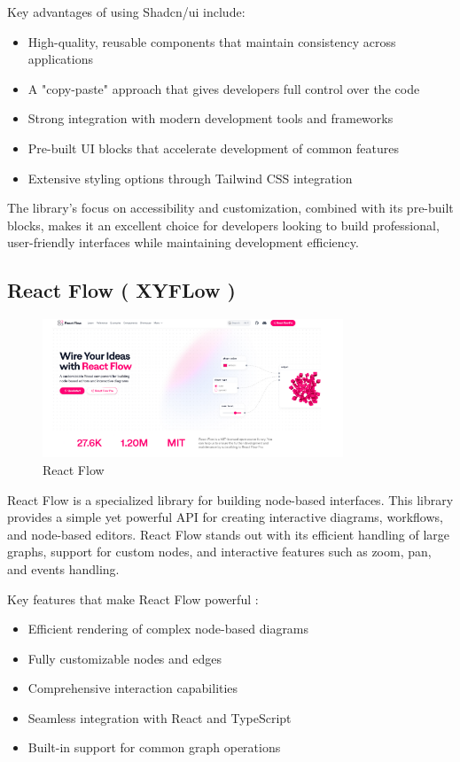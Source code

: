 Key advantages of using Shadcn/ui include:

\begin{itemize}
\item High-quality, reusable components that maintain consistency across applications
\item A "copy-paste" approach that gives developers full control over the code
\item Strong integration with modern development tools and frameworks
\item Pre-built UI blocks that accelerate development of common features
\item Extensive styling options through Tailwind CSS integration
\end{itemize}

The library's focus on accessibility and customization, combined with its pre-built blocks, makes it an excellent choice for developers looking to build professional, user-friendly interfaces while maintaining development efficiency.
\subsection{React Flow ( XYFLow )}
\begin{figure}[H]
    \centering
    \includegraphics[width=0.8\textwidth]{figures/reactxy.png}
    \caption{React Flow}
\end{figure}
React Flow is a specialized library for building node-based interfaces. This library provides a simple yet powerful API for creating interactive diagrams, workflows, and node-based editors. React Flow stands out with its efficient handling of large graphs, support for custom nodes, and interactive features such as zoom, pan, and events handling.

Key features that make React Flow powerful \cite{reactflow}:

\begin{itemize}
\item Efficient rendering of complex node-based diagrams
\item Fully customizable nodes and edges
\item Comprehensive interaction capabilities
\item Seamless integration with React and TypeScript
\item Built-in support for common graph operations
\end{itemize}

